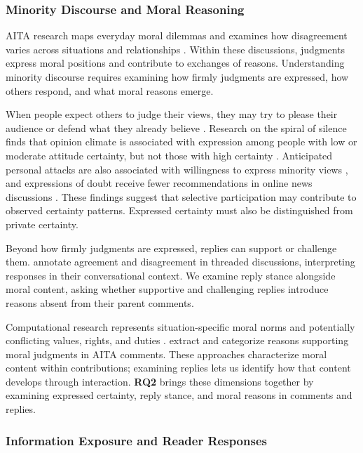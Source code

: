 \subsubsection*{Minority Discourse and Moral Reasoning}

AITA research maps everyday moral dilemmas and examines how disagreement
varies across situations and relationships
\cite{nguyen2022mapping,shi2025moral}. Within these discussions, judgments
express moral positions and contribute to exchanges of reasons.
Understanding minority discourse requires examining how firmly judgments
are expressed, how others respond, and what moral reasons emerge.

When people expect others to judge their views, they may try to please
their audience or defend what they already believe
\cite{tetlock1989strategies}. Research on the spiral of silence finds
that opinion climate is associated with expression among people with low
or moderate attitude certainty, but not those with high certainty
\cite{matthes2010spiral}. Anticipated personal attacks are also associated
with willingness to express minority views \cite{neubaum2018sanctions},
and expressions of doubt receive fewer recommendations in online news
discussions \cite{evans2023doubt}. These findings suggest that selective
participation may contribute to observed certainty patterns. Expressed
certainty must also be distinguished from private certainty.

Beyond how firmly judgments are expressed, replies can support or
challenge them. \citet{andreas2012annotating} annotate agreement and
disagreement in threaded discussions, interpreting responses in their
conversational context. We examine reply stance alongside moral
content, asking whether supportive and challenging replies introduce
reasons absent from their parent comments.

Computational research represents situation-specific moral norms
\cite{forbes2020social} and potentially conflicting values, rights, and
duties \cite{sorensen2024value}. \citet{xi2024morality} extract and
categorize reasons supporting moral judgments in AITA comments. These
approaches characterize moral content within contributions; examining
replies lets us identify how that content develops through interaction.
\textbf{RQ2} brings these dimensions together by examining expressed
certainty, reply stance, and moral reasons in comments and replies.

\subsubsection*{Information Exposure and Reader Responses}

